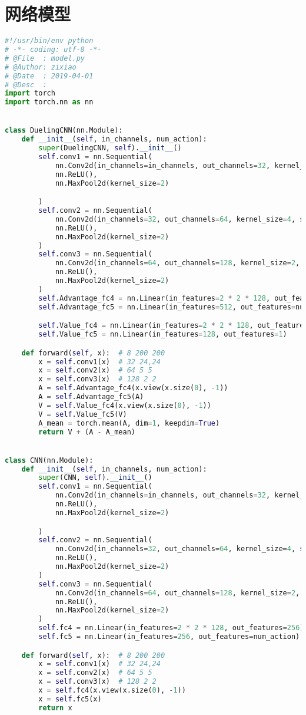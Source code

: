 \section{网络模型}
\begin{lstlisting}[language={python}]
#!/usr/bin/env python
# -*- coding: utf-8 -*-
# @File  : model.py
# @Author: zixiao
# @Date  : 2019-04-01
# @Desc  :
import torch
import torch.nn as nn


class DuelingCNN(nn.Module):
    def __init__(self, in_channels, num_action):
        super(DuelingCNN, self).__init__()
        self.conv1 = nn.Sequential(
            nn.Conv2d(in_channels=in_channels, out_channels=32, kernel_size=8, stride=4),
            nn.ReLU(),
            nn.MaxPool2d(kernel_size=2)

        )
        self.conv2 = nn.Sequential(
            nn.Conv2d(in_channels=32, out_channels=64, kernel_size=4, stride=2),
            nn.ReLU(),
            nn.MaxPool2d(kernel_size=2)
        )
        self.conv3 = nn.Sequential(
            nn.Conv2d(in_channels=64, out_channels=128, kernel_size=2, stride=1),
            nn.ReLU(),
            nn.MaxPool2d(kernel_size=2)
        )
        self.Advantage_fc4 = nn.Linear(in_features=2 * 2 * 128, out_features=512)
        self.Advantage_fc5 = nn.Linear(in_features=512, out_features=num_action)

        self.Value_fc4 = nn.Linear(in_features=2 * 2 * 128, out_features=128)
        self.Value_fc5 = nn.Linear(in_features=128, out_features=1)

    def forward(self, x):  # 8 200 200
        x = self.conv1(x)  # 32 24,24
        x = self.conv2(x)  # 64 5 5
        x = self.conv3(x)  # 128 2 2
        A = self.Advantage_fc4(x.view(x.size(0), -1))
        A = self.Advantage_fc5(A)
        V = self.Value_fc4(x.view(x.size(0), -1))
        V = self.Value_fc5(V)
        A_mean = torch.mean(A, dim=1, keepdim=True)
        return V + (A - A_mean)


class CNN(nn.Module):
    def __init__(self, in_channels, num_action):
        super(CNN, self).__init__()
        self.conv1 = nn.Sequential(
            nn.Conv2d(in_channels=in_channels, out_channels=32, kernel_size=8, stride=4),
            nn.ReLU(),
            nn.MaxPool2d(kernel_size=2)

        )
        self.conv2 = nn.Sequential(
            nn.Conv2d(in_channels=32, out_channels=64, kernel_size=4, stride=2),
            nn.ReLU(),
            nn.MaxPool2d(kernel_size=2)
        )
        self.conv3 = nn.Sequential(
            nn.Conv2d(in_channels=64, out_channels=128, kernel_size=2, stride=1),
            nn.ReLU(),
            nn.MaxPool2d(kernel_size=2)
        )
        self.fc4 = nn.Linear(in_features=2 * 2 * 128, out_features=256)
        self.fc5 = nn.Linear(in_features=256, out_features=num_action)

    def forward(self, x):  # 8 200 200
        x = self.conv1(x)  # 32 24,24
        x = self.conv2(x)  # 64 5 5
        x = self.conv3(x)  # 128 2 2
        x = self.fc4(x.view(x.size(0), -1))
        x = self.fc5(x)
        return x
    
\end{lstlisting}
